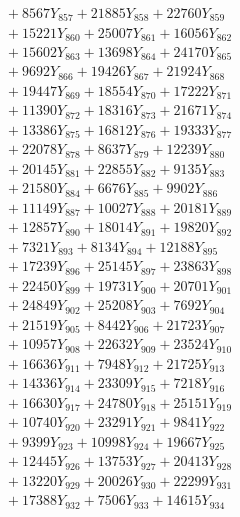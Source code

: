 \documentclass[a4paper,10pt]{article}
\begin{document}
{\begin{align}
&\;  + 8567 Y_{857} + 21885 Y_{858} + 22760 Y_{859} \\[0.3ex]
&\;  + 15221 Y_{860} + 25007 Y_{861} + 16056 Y_{862} \\[0.3ex]
&\;  + 15602 Y_{863} + 13698 Y_{864} + 24170 Y_{865} \\[0.3ex]
&\;  + 9692 Y_{866} + 19426 Y_{867} + 21924 Y_{868} \\[0.5ex]\allowbreak
&\;  + 19447 Y_{869} + 18554 Y_{870} + 17222 Y_{871} \\[0.3ex]
&\;  + 11390 Y_{872} + 18316 Y_{873} + 21671 Y_{874} \\[0.3ex]
&\;  + 13386 Y_{875} + 16812 Y_{876} + 19333 Y_{877} \\[0.3ex]
&\;  + 22078 Y_{878} + 8637 Y_{879} + 12239 Y_{880} \\[0.3ex]
&\;  + 20145 Y_{881} + 22855 Y_{882} + 9135 Y_{883} \\[0.3ex]
&\;  + 21580 Y_{884} + 6676 Y_{885} + 9902 Y_{886} \\[0.3ex]
&\;  + 11149 Y_{887} + 10027 Y_{888} + 20181 Y_{889} \\[0.3ex]
&\;  + 12857 Y_{890} + 18014 Y_{891} + 19820 Y_{892} \\[0.3ex]
&\;  + 7321 Y_{893} + 8134 Y_{894} + 12188 Y_{895} \\[0.3ex]
&\;  + 17239 Y_{896} + 25145 Y_{897} + 23863 Y_{898} \\[0.5ex]\allowbreak
&\;  + 22450 Y_{899} + 19731 Y_{900} + 20701 Y_{901} \\[0.3ex]
&\;  + 24849 Y_{902} + 25208 Y_{903} + 7692 Y_{904} \\[0.3ex]
&\;  + 21519 Y_{905} + 8442 Y_{906} + 21723 Y_{907} \\[0.3ex]
&\;  + 10957 Y_{908} + 22632 Y_{909} + 23524 Y_{910} \\[0.3ex]
&\;  + 16636 Y_{911} + 7948 Y_{912} + 21725 Y_{913} \\[0.3ex]
&\;  + 14336 Y_{914} + 23309 Y_{915} + 7218 Y_{916} \\[0.3ex]
&\;  + 16630 Y_{917} + 24780 Y_{918} + 25151 Y_{919} \\[0.3ex]
&\;  + 10740 Y_{920} + 23291 Y_{921} + 9841 Y_{922} \\[0.3ex]
&\;  + 9399 Y_{923} + 10998 Y_{924} + 19667 Y_{925} \\[0.3ex]
&\;  + 12445 Y_{926} + 13753 Y_{927} + 20413 Y_{928} \\[0.5ex]\allowbreak
&\;  + 13220 Y_{929} + 20026 Y_{930} + 22299 Y_{931} \\[0.3ex]
&\;  + 17388 Y_{932} + 7506 Y_{933} + 14615 Y_{934} \\[0.3ex]

\end{align}}
\end{document}
